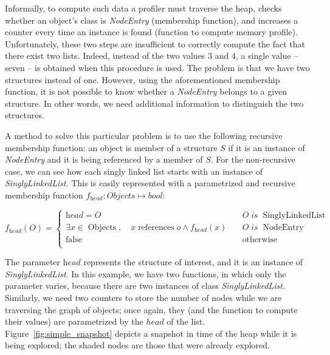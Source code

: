 Informally, to compute such data a profiler must traverse the heap, checks whether an object's class is \textit{NodeEntry} (membership function), and increases a counter every time an instance is found (function to compute memory profile).
Unfortunately, these two steps are insufficient to correctly compute the fact that there exist two lists.
Indeed,  instead of the two values 3 and 4, a single value -- seven -- is obtained when this procedure is used.
The problem is that we have two structures instead of one.
However, using the aforementioned membership function, it is not possible to know whether a \textit{NodeEntry} belongs to a given structure.
In other words, we need additional information to distinguish the two structures.

A method to solve this particular problem is to use the following recursive membership function: an object is member of a structure $S$ if it is an instance of \textit{NodeEntry} and it is being referenced by a member of $S$.
For the non-recursive case, we can see how each singly linked list starts with an instance of \textit{SinglyLinkedList}.
This is easily represented with a parametrized and recursive membership function $f_{\textit{head}}: \textit{Objects} \mapsto \textit{bool}$:

\begin{equation} \label{eq:simply-list}
	f_{\textit{head}}\left(O\right) = 
	\begin{cases}
		\textit{head} = O & \quad O \; is \; \operatorname{SinglyLinkedList} \\
		\exists {x \in \operatorname{Objects}}, \quad x \operatorname{references} o \wedge f_{\textit{head}}\left(x\right) & \quad O \; is \; \operatorname{NodeEntry} \\
		\operatorname{false} & \quad \operatorname{otherwise} \\
	\end{cases}
\end{equation}

The parameter $\textit{head}$ represents the structure of interest, and it is an instance of \textit{SinglyLinkedList}.
In this example, we have two functions, in which only the parameter varies, because there are two instances of class \textit{SinglyLinkedList}.
Similarly, we need two counters to store the number of nodes while we are traversing the graph of objects; once again, they (and the function to compute their values) are parametrized by the $head$ of the list.
Figure~\ref{fig:simple_snapshot} depicts a snapshot in time of the heap while it is being explored;
the shaded nodes are those that were already explored.

